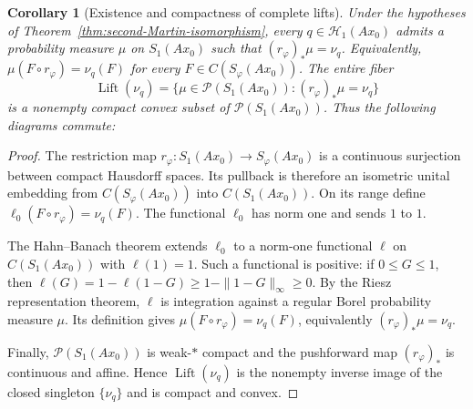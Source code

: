 \documentclass{amsart}
\newtheorem{corollary}[theorem]{Corollary}
\theoremstyle{definition}
\theoremstyle{remark}
\numberwithin{equation}{section}
\begin{document}
\begin{corollary}[Existence and compactness of complete lifts]
\label{cor:universal-lifting-Keisler-measure}
Under the hypotheses of Theorem~\ref{thm:second-Martin-isomorphism}, every $q\in\mathscr H_1(Ax_0)$ admits a probability measure $\mu$ on $S_1(Ax_0)$ such that $(r_\varphi)_*\mu=\nu_q$. Equivalently, $\mu(F\circ r_\varphi)=\nu_q(F)$ for every $F\in C(S_\varphi(Ax_0))$. The entire fiber 
$$\operatorname{Lift}(\nu_q)=\{\mu\in\mathcal P(S_1(Ax_0)):(r_\varphi)_*\mu=\nu_q\}$$
is a nonempty compact convex subset of $\mathcal P(S_1(Ax_0))$. Thus the following diagrams commute:
\begin{center}
\end{center}
\begin{center}
\end{center}
\end{corollary}

\begin{proof}
The restriction map $r_\varphi:S_1(Ax_0)\to S_\varphi(Ax_0)$ is a continuous surjection between compact Hausdorff spaces. Its pullback is therefore an isometric unital embedding from $C(S_\varphi(Ax_0))$ into $C(S_1(Ax_0))$. On its range define $\ell_0(F\circ r_\varphi)=\nu_q(F)$. The functional $\ell_0$ has norm one and sends $1$ to $1$.

The Hahn--Banach theorem extends $\ell_0$ to a norm-one functional $\ell$ on $C(S_1(Ax_0))$ with $\ell(1)=1$. Such a functional is positive: if $0\le G\le1$, then $\ell(G)=1-\ell(1-G)\ge1-\|1-G\|_\infty\ge0$. By the Riesz representation theorem, $\ell$ is integration against a regular Borel probability measure $\mu$. Its definition gives $\mu(F\circ r_\varphi)=\nu_q(F)$, equivalently $(r_\varphi)_*\mu=\nu_q$.

Finally, $\mathcal P(S_1(Ax_0))$ is weak-$*$ compact and the pushforward map $(r_\varphi)_*$ is continuous and affine. Hence $\operatorname{Lift}(\nu_q)$ is the nonempty inverse image of the closed singleton $\{\nu_q\}$ and is compact and convex. 
\end{proof}
\end{document}
